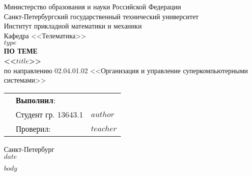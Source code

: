 \documentclass[]{article}
\begin{document}
	\thispagestyle{empty}
	\begin{center}
		Министерство образования и науки Российской Федерации\\
		Санкт-Петербургский государственный технический университет\\
		Институт прикладной математики и механики\\
		Кафедра <<Телематика>>\\
		\vspace{5cm}
		\textbf{\textbf{\MakeUppercase{$type$}}}\\
        \vspace{0.5cm}
        \textbf{ПО ТЕМЕ}\\
        \vspace{0.5cm}
		\textbf{\textbf{<<$title$>>}}\\
		\vspace{3cm}
		по направлению 02.04.01.02 <<Организация и управление суперкомпьютерными системами>>
	\end{center}
	\vspace{2cm}
	\begin{tabular} {l l l}
	\hspace{9.5cm} & \textbf{Выполнил}: & \\
	& Студент гр. 13643.1 & $author$\\
	& Проверил: & $teacher$
	\end{tabular}
	\vspace*{\fill}
	\begin{center}
		Санкт-Петербург\\
		$date$
	\end{center}
	\newpage

	\renewcommand\contentsname{Оглавление}
	\tableofcontents
	\newpage

	$body$
\end{document}

